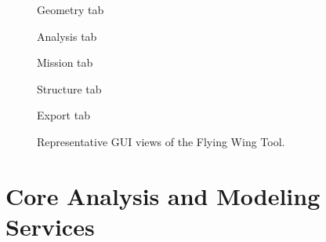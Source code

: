 \begin{figure}[htbp]
\centering
\begin{minipage}[t]{0.48\textwidth}
\centering
{}

\small Geometry tab
\end{minipage}
\hfill
\begin{minipage}[t]{0.48\textwidth}
\centering
{}

\small Analysis tab
\end{minipage}

\vspace{0.8em}

\begin{minipage}[t]{0.48\textwidth}
\centering
{}

\small Mission tab
\end{minipage}
\hfill
\begin{minipage}[t]{0.48\textwidth}
\centering
{}

\small Structure tab
\end{minipage}

\vspace{0.8em}

\begin{minipage}[t]{0.6\textwidth}
\centering
{}

\small Export tab
\end{minipage}
\caption{Representative GUI views of the Flying Wing Tool.}
\label{fig:gui-tab-overview}
\end{figure}

\section{Core Analysis and Modeling Services}
